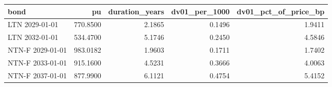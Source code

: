 \begin{tabular}{lrrrr}
\toprule
bond & pu & duration_years & dv01_per_1000 & dv01_pct_of_price_bp \\
\midrule
LTN 2029-01-01 & 770.8500 & 2.1865 & 0.1496 & 1.9411 \\
LTN 2032-01-01 & 534.4700 & 5.1746 & 0.2450 & 4.5846 \\
NTN-F 2029-01-01 & 983.0182 & 1.9603 & 0.1711 & 1.7402 \\
NTN-F 2033-01-01 & 915.1600 & 4.5231 & 0.3666 & 4.0063 \\
NTN-F 2037-01-01 & 877.9900 & 6.1121 & 0.4754 & 5.4152 \\
\bottomrule
\end{tabular}
